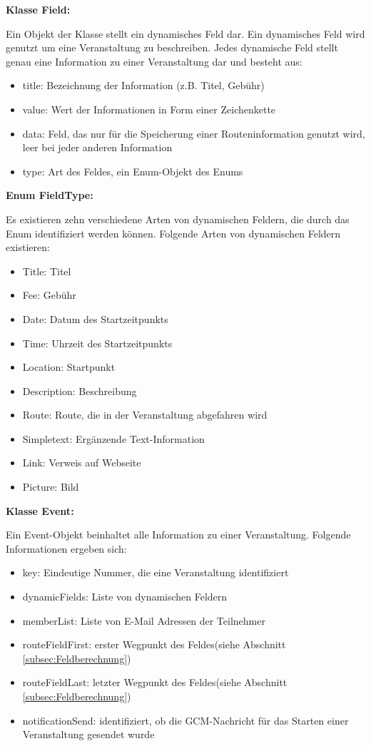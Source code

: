 \textbf{Klasse Field:}

Ein Objekt der Klasse  stellt ein dynamisches Feld dar. Ein dynamisches Feld wird genutzt um eine Veranstaltung zu beschreiben. Jedes dynamische Feld stellt genau eine Information zu einer Veranstaltung dar und besteht aus:

\begin{itemize}
	\item title: Bezeichnung der Information (z.B. \glqq Titel\grqq, \glqq Gebühr\grqq)
	\item value: Wert der Informationen in Form einer Zeichenkette
	\item data: Feld, das nur für die Speicherung einer Routeninformation genutzt wird, leer bei jeder anderen Information
	\item type: Art des Feldes, ein Enum-Objekt des Enums 
\end{itemize}

\textbf{Enum FieldType:}

Es existieren zehn verschiedene Arten von dynamischen Feldern, die durch das Enum  identifiziert werden können. Folgende Arten von dynamischen Feldern existieren:

\begin{itemize}
	\item Title: Titel
	\item Fee: Gebühr
	\item Date: Datum des Startzeitpunkts
	\item Time: Uhrzeit des Startzeitpunkts
	\item Location: Startpunkt
	\item Description: Beschreibung
	\item Route: Route, die in der Veranstaltung abgefahren wird
	\item Simpletext: Ergänzende Text-Information
	\item Link: Verweis auf Webseite
	\item Picture: Bild
\end{itemize}

\textbf{Klasse Event:}

Ein Event-Objekt beinhaltet alle Information zu einer Veranstaltung. Folgende Informationen ergeben sich:

\begin{itemize}
	\item key: Eindeutige Nummer, die eine Veranstaltung identifiziert
	\item dynamicFields: Liste von dynamischen Feldern
	\item memberList: Liste von E-Mail Adressen der Teilnehmer
	\item routeFieldFirst: erster Wegpunkt des Feldes(siehe Abschnitt \ref{subsec:Feldberechnung})
	\item routeFieldLast: letzter Wegpunkt des Feldes(siehe Abschnitt \ref{subsec:Feldberechnung})
	\item notificationSend: identifiziert, ob die GCM-Nachricht für das Starten einer Veranstaltung gesendet wurde
\end{itemize}

